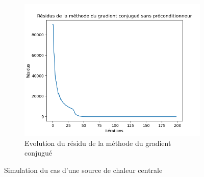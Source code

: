 \documentclass{article}
\begin{document}
\begin{figure}[ht]
\begin{subfigure}{0.3\textwidth}
    \centering
    \includegraphics[width=\linewidth]{Chaleur_1c.png}
    \caption{Evolution du résidu de la méthode du gradient conjugué}
    \label{subfig:central_source_residus}
  \end{subfigure}
  \caption{Simulation du cas d'une source de chaleur centrale}
  \label{fig:central_source}
\end{figure}
\end{document}
